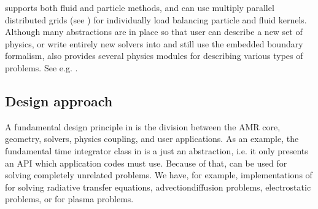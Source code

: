 \documentclass[letterpaper,10pt,english]{sphinxmanual}
\begin{document}
\sphinxAtStartPar
{} supports both fluid and particle methods, and can use multiply parallel distributed grids (see {\hyperref[\detokenize{Source/Realm:chap-realm}]{}}) for individually load balancing particle and fluid kernels.
Although many abstractions are in place so that user can describe a new set of physics, or write entirely new solvers into  and still use the embedded boundary formalism,  also provides several physics modules for describing various types of problems.
See e.g. {\hyperref[\detokenize{Applications/ImplementedModels:chap-implementedmodels}]{}}.


\subsection{Design approach}
\label{\detokenize{Base/Overview:design-approach}}
\sphinxAtStartPar
A fundamental design principle in  is the division between the AMR core, geometry, solvers, physics coupling, and user applications.
As an example, the fundamental time integrator class  in  is a just an abstraction, i.e. it only presents an API which application codes must use.
Because of that,  can be used for solving completely unrelated problems.
We have, for example, implementations of  for solving radiative transfer equations, advection\sphinxhyphen{}diffusion problems, electrostatic problems, or for plasma problems.
\end{document}
